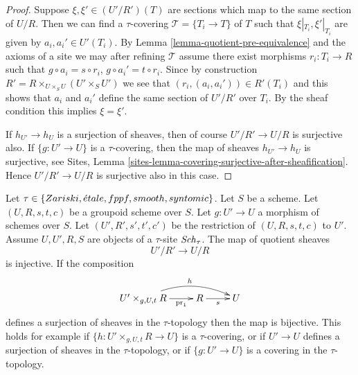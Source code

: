 \begin{proof}
Suppose $\xi, \xi' \in (U'/R')(T)$ are sections which
map to the same section of $U/R$.
Then we can find a $\tau$-covering $\mathcal{T} = \{T_i \to T\}$ of $T$
such that $\xi|_{T_i}, \xi'|_{T_i}$ are given by $a_i, a_i' \in U'(T_i)$. By
Lemma \ref{lemma-quotient-pre-equivalence}
and the axioms of a site we may after refining
$\mathcal{T}$ assume there exist morphisms $r_i : T_i \to R$
such that $g \circ a_i = s \circ r_i$, $g \circ a_i' = t \circ r_i$.
Since by construction
$R' = R \times_{U \times_S U} (U' \times_S U')$
we see that $(r_i, (a_i, a_i')) \in R'(T_i)$ and this
shows that $a_i$ and $a_i'$ define the same section
of $U'/R'$ over $T_i$. By the sheaf condition this implies
$\xi = \xi'$.

\medskip\noindent
If $h_{U'} \to h_U$ is a surjection
of sheaves, then of course $U'/R' \to U/R$ is surjective also.
If $\{g : U' \to U\}$ is a $\tau$-covering, then
the map of sheaves $h_{U'} \to h_U$ is surjective, see
Sites, Lemma \ref{sites-lemma-covering-surjective-after-sheafification}.
Hence $U'/R' \to U/R$ is surjective also in this case.
\end{proof}

\begin{lemma}
\label{lemma-quotient-groupoid-restrict}
Let $\tau \in \{Zariski, {\acute{e}tale}, fppf, smooth, syntomic\}$.
Let $S$ be a scheme.
Let $(U, R, s, t, c)$ be a groupoid scheme over $S$.
Let $g : U' \to U$ a morphism of schemes over $S$.
Let $(U', R', s', t', c')$ be the restriction of $(U, R, s, t, c)$ to $U'$.
Assume  $U, U', R, S$ are objects of a $\tau$-site $\mathit{Sch}_\tau$.
The map of quotient sheaves
$$
U'/R' \longrightarrow U/R
$$
is injective. If the composition
$$
\xymatrix{
U' \times_{g, U, t} R \ar[r]_-{\text{pr}_1} \ar@/^3ex/[rr]^h
& R \ar[r]_s & U
}
$$
defines a surjection of sheaves in the $\tau$-topology  then
the map is bijective. This holds for example if
$\{h : U' \times_{g, U, t} R \to U\}$ is a $\tau$-covering, or
if $U' \to U$ defines a surjection of sheaves in the $\tau$-topology, or if
$\{g : U' \to U\}$ is a covering in the $\tau$-topology.
\end{lemma}

